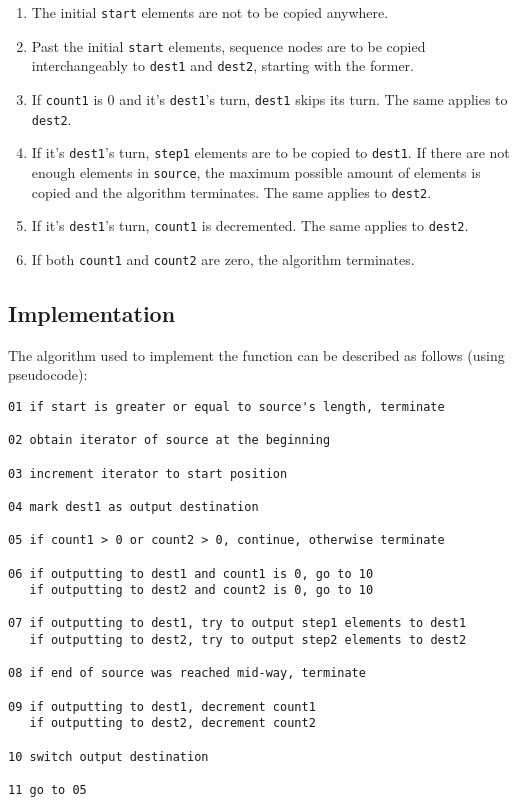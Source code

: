 ﻿\documentclass{article}
\begin{document}
\begin{enumerate}
\item The initial {\tt start} elements are not to be copied anywhere.

\item  Past the initial {\tt start} elements, sequence nodes are to be copied
interchangeably to {\tt dest1} and {\tt dest2}, starting with the former.

\item  If {\tt count1} is 0 and it's {\tt dest1}'s turn, {\tt dest1} skips its
turn. The same applies to {\tt dest2}.

\item  If it's {\tt dest1}'s turn, {\tt step1} elements are to be copied to
{\tt dest1}. If there are not enough elements in {\tt source}, the maximum
possible amount of elements is copied and the algorithm terminates.
The same applies to {\tt dest2}.

\item  If it's {\tt dest1}'s turn, {\tt count1} is decremented. The same applies
to {\tt dest2}.

\item If both {\tt count1} and {\tt count2} are zero, the algorithm terminates.
\end{enumerate}

\subsection{Implementation}

The algorithm used to implement the function can be described as follows
(using pseudocode):

\begin{verbatim}
01 if start is greater or equal to source's length, terminate

02 obtain iterator of source at the beginning

03 increment iterator to start position

04 mark dest1 as output destination

05 if count1 > 0 or count2 > 0, continue, otherwise terminate

06 if outputting to dest1 and count1 is 0, go to 10
   if outputting to dest2 and count2 is 0, go to 10
   
07 if outputting to dest1, try to output step1 elements to dest1
   if outputting to dest2, try to output step2 elements to dest2

08 if end of source was reached mid-way, terminate

09 if outputting to dest1, decrement count1
   if outputting to dest2, decrement count2

10 switch output destination

11 go to 05

\end{verbatim}
\end{document}
